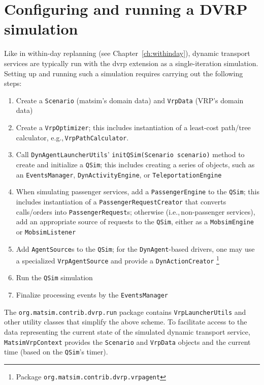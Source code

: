 \section{Configuring and running a DVRP simulation}
\label{sec:dvrp_config}
Like in within-day replanning (see Chapter~\ref{ch:withinday}), dynamic transport services are typically run with the \gls{dvrp} extension as a single-iteration simulation. Setting up and running such a simulation requires carrying out the following steps:
%
\begin{enumerate}
	\item Create a \lstinline$Scenario$ (\gls{matsim}'s domain data) and \lstinline$VrpData$ (VRP's domain data)
	
	\item Create a \lstinline$VrpOptimizer$; this includes instantiation of a least-cost path/tree calculator, e.g.,\,\lstinline$VrpPathCalculator$.
	
	\item Call \lstinline$DynAgentLauncherUtils$' \lstinline$initQSim(Scenario scenario)$ method to create and initialize a \lstinline$QSim$; this includes creating a series of objects, such as an \lstinline$EventsManager$, \lstinline$DynActivityEngine$, or \lstinline$TeleportationEngine$
	
	\item When simulating passenger services, add a \lstinline$PassengerEngine$ to the \lstinline$QSim$; this includes instantiation of a \lstinline$PassengerRequestCreator$ that converts calls/orders into \lstinline$PassengerRequest$s; otherwise (i.e.,\,non-passenger services), add an appropriate source of requests to the \lstinline$QSim$, either as a \lstinline$MobsimEngine$ or \lstinline$MobsimListener$
	
	\item Add \lstinline$AgentSource$s to the \lstinline$QSim$; for the \lstinline$DynAgent$-based drivers, one may use a specialized \lstinline$VrpAgentSource$ and provide a \lstinline$DynActionCreator$%
	\footnote{
	Package \lstinline$org.matsim.contrib.dvrp.vrpagent$
	}
	
	\item Run the \lstinline$QSim$ simulation
	
	\item Finalize processing events by the \lstinline$EventsManager$
\end{enumerate}

The \lstinline$org.matsim.contrib.dvrp.run$ package contains \lstinline$VrpLauncherUtils$ and other utility classes that simplify the above scheme. To facilitate access to the data representing the current state of the simulated dynamic transport service, \lstinline$MatsimVrpContext$ provides the \lstinline$Scenario$ and \lstinline$VrpData$ objects and the current time (based on the \lstinline$QSim$'s timer).

